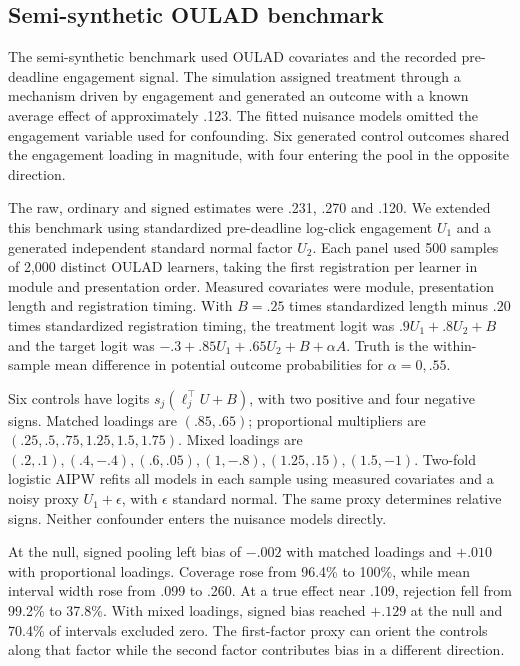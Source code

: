 
\subsection{Semi-synthetic OULAD benchmark}

The semi-synthetic benchmark used OULAD covariates and the recorded pre-deadline engagement signal. The simulation assigned treatment through a mechanism driven by engagement and generated an outcome with a known average effect of approximately .123. The fitted nuisance models omitted the engagement variable used for confounding. Six generated control outcomes shared the engagement loading in magnitude, with four entering the pool in the opposite direction.

The raw, ordinary and signed estimates were .231, .270 and .120. We extended this benchmark using standardized pre-deadline log-click engagement $U_1$ and a generated independent standard normal factor $U_2$. Each panel used 500 samples of 2,000 distinct OULAD learners, taking the first registration per learner in module and presentation order. Measured covariates were module, presentation length and registration timing. With $B=.25$ times standardized length minus $.20$ times standardized registration timing, the treatment logit was $.9U_1+.8U_2+B$ and the target logit was $-.3+.85U_1+.65U_2+B+\alpha A$. Truth is the within-sample mean difference in potential outcome probabilities for $\alpha=0,.55$.

Six controls have logits $s_j(\ell_j^\top U+B)$, with two positive and four negative signs. Matched loadings are $(.85,.65)$; proportional multipliers are $(.25,.5,.75,1.25,1.5,1.75)$. Mixed loadings are $(.2,.1),(.4,-.4),(.6,.05),(1,-.8),(1.25,.15),(1.5,-1)$. Two-fold logistic AIPW refits all models in each sample using measured covariates and a noisy proxy $U_1+\epsilon$, with $\epsilon$ standard normal. The same proxy determines relative signs. Neither confounder enters the nuisance models directly.



At the null, signed pooling left bias of $-.002$ with matched loadings and $+.010$ with proportional loadings. Coverage rose from 96.4\% to 100\%, while mean interval width rose from .099 to .260. At a true effect near .109, rejection fell from 99.2\% to 37.8\%. With mixed loadings, signed bias reached $+.129$ at the null and 70.4\% of intervals excluded zero. The first-factor proxy can orient the controls along that factor while the second factor contributes bias in a different direction.


